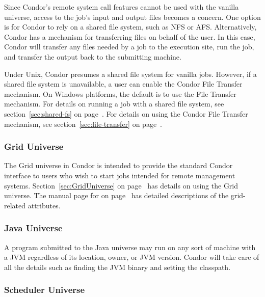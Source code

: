 Since Condor's remote system call features cannot be used with the
vanilla universe, access to the job's input and output files becomes a
concern.
One option is for Condor to rely on a shared file system, such as NFS
or AFS. 
Alternatively, Condor has a mechanism for transferring files on behalf
of the user.
In this case, Condor will transfer any files needed by a job to the
execution site, run the job, and transfer the output back to the
submitting machine.

Under Unix, Condor presumes a shared file system for vanilla jobs. 
However, if a shared file system is unavailable, a user can enable the
Condor File Transfer mechanism.
On Windows platforms, the default is to use the File Transfer
mechanism.
For details on running a job with a shared file system, see
section~\ref{sec:shared-fs} on page~\pageref{sec:shared-fs}.
For details on using the Condor File Transfer mechanism, see 
section~\ref{sec:file-transfer} on page~\pageref{sec:file-transfer}.


\subsubsection{Grid Universe}

The Grid universe in Condor is intended to provide the standard
Condor interface to users who wish to start jobs
intended for remote management systems.
Section~\ref{sec:GridUniverse} on page~\pageref{sec:GridUniverse}
has details on using the Grid universe.
The manual page for 
on page~\pageref{man-condor-submit}
has detailed descriptions of
the grid-related attributes.

\subsubsection{Java Universe}


A program submitted to the Java universe may run on any sort of machine
with a JVM regardless of its location, owner, or JVM version.  Condor
will take care of all the details such as finding the JVM binary and
setting the classpath.

\subsubsection{Scheduler Universe}


